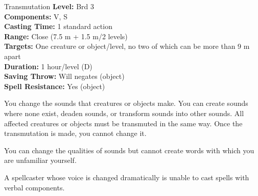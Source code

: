 {Transmutation}
{
	\textbf{Level:}
	Brd 3\\
	\textbf{Components:}
	V, S\\
	\textbf{Casting Time:}
	1 standard action\\
	\textbf{Range:}
	Close (7.5 m + 1.5 m/2 levels)\\
	\textbf{Targets:}
	One creature or object/level, no two of which can be more than 9 m apart\\
	\textbf{Duration:}
	1 hour/level (D)\\
	\textbf{Saving Throw:}
	Will negates (object)\\
	\textbf{Spell Resistance:}
	Yes (object)\\
}
{
	You change the sounds that creatures or objects make. You can create sounds where none exist, deaden sounds, or transform sounds into other sounds. All affected creatures or objects must be transmuted in the same way. Once the transmutation is made, you cannot change it.

	You can change the qualities of sounds but cannot create words with which you are unfamiliar yourself.

	A spellcaster whose voice is changed dramatically is unable to cast spells with verbal components.

}
